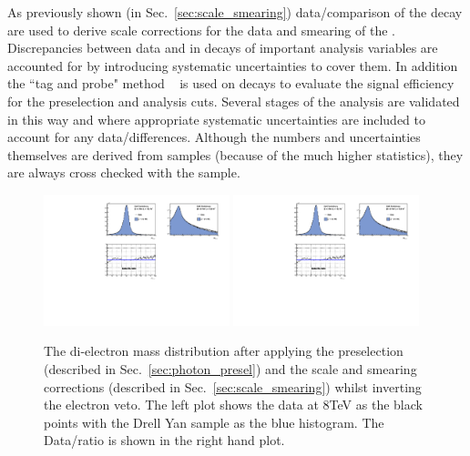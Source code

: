As previously shown (in Sec.~\ref{sec:scale_smearing}) data/\MC comparison of the \Zee decay are used to derive scale corrections for the data and smearing of the \MC. Discrepancies between data and \MC in \Zee decays of important analysis variables are accounted for by introducing systematic uncertainties to cover them. In addition the ``tag and probe" method ~\cite{tag_and_probe} is used on \Zee decays to evaluate the signal efficiency for the preselection and analysis cuts. Several stages of the analysis are validated in this way and where appropriate systematic uncertainties are included to account for any data/\MC differences. Although the numbers and uncertainties themselves are derived from \Zee samples (because of the much higher statistics), they are always cross checked with the \Zmumugamma sample.

\begin{figure}
  \includegraphics[width=0.48\textwidth]{analysis_comps/plots/zee_mass.pdf}
  \includegraphics[width=0.48\textwidth]{analysis_comps/plots/zee_mass_ratio.pdf}
  \caption{The di-electron mass distribution after applying the preselection (described in Sec.~\ref{sec:photon_presel}) and the scale and smearing corrections (described in Sec.~\ref{sec:scale_smearing}) whilst inverting the electron veto. The left plot shows the data at 8TeV as the black points with the Drell Yan \MC sample as the blue histogram. The Data/\MC ratio is shown in the right hand plot. }
  \label{fig:dielectronmass}
\end{figure}
